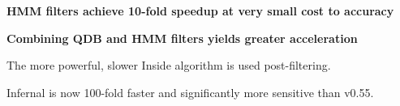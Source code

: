 \documentclass[landscape]{slides}
\begin{document}
\begin{slide}

\begin{center}
\textbf{HMM filters achieve 10-fold speedup at very small cost to accuracy}
\end{center}


\vfill

\end{slide}
\begin{slide}

\begin{center}
\normalsize
\textbf{Combining QDB and HMM filters yields greater acceleration}

\small
%
The more powerful, slower Inside algorithm is used post-filtering.

Infernal is now 100-fold faster and significantly more sensitive than v0.55.
%

\end{center}


\vfill

\end{slide}
\end{document}
